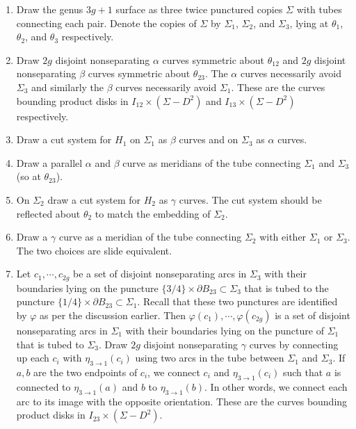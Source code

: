 \documentclass[12pt]{amsart}
\newcommand{\del}{\partial }
\theoremstyle{definition}
\theoremstyle{remark}
\begin{document}
\begin{enumerate}
\item Draw the genus $3g+1$ surface as three twice punctured copies $\Sigma$ with tubes connecting each pair.
Denote the copies of $\Sigma$ by $\Sigma_1$, $\Sigma_2$, and $\Sigma_3$, lying at $\theta_1$, $\theta_2$, and $\theta_3$ respectively.
\item Draw $2g$ disjoint nonseparating $\alpha$ curves symmetric about $\theta_{12}$ and $2g$ disjoint nonseparating $\beta$ curves symmetric about $\theta_{23}$.
The $\alpha$ curves necessarily avoid $\Sigma_3$ and similarly the $\beta$ curves necessarily avoid $\Sigma_1$.
These are the curves bounding product disks in $I_{12} \times (\Sigma - D^2)$ and $I_{13} \times (\Sigma - D^2)$ respectively.
\item Draw a cut system for $H_1$ on $\Sigma_1$ as $\beta$ curves and on $\Sigma_3$ as $\alpha$ curves.
\item Draw a parallel $\alpha$ and $\beta$ curve as meridians of the tube connecting  $\Sigma_1$ and $\Sigma_3$ (so at $\theta_{23}$).

\item On $\Sigma_2$ draw a cut system for $H_2$ as $\gamma$ curves.
The cut system should be reflected about $\theta_2$ to match the embedding of $\Sigma_2$.
\item Draw a $\gamma$ curve as a meridian of the tube connecting $\Sigma_2$ with either $\Sigma_1$ or $\Sigma_3$.
The two choices are slide equivalent.
\item Let $c_1,\cdots,c_{2g}$ be a set of disjoint nonseparating arcs in $\Sigma_3$ with their boundaries lying on the puncture $\{3/4\} \times \del B_{23} \subset \Sigma_3$ that is tubed to the puncture $\{1/4\} \times \del B_{23} \subset \Sigma_1$.
Recall that these two punctures are identified by $\varphi$ as per the discussion earlier.
Then $\varphi(c_1),\cdots,\varphi(c_{2g})$ is a set of disjoint nonseparating arcs in $\Sigma_1$ with their boundaries lying on the puncture of $\Sigma_1$ that is tubed to $\Sigma_3$.
Draw $2g$ disjoint nonseparating $\gamma$ curves by connecting up each $c_i$ with $\eta_{3 \to 1}(c_i)$ using two arcs in the tube between $\Sigma_1$ and $\Sigma_3$.
If $a,b$ are the two endpoints of $c_i$, we connect $c_i$ and $\eta_{3 \to 1}(c_i)$ such that $a$ is connected to $\eta_{3 \to 1}(a)$ and $b$ to $\eta_{3 \to 1}(b)$.
In other words, we connect each arc to its image with the opposite orientation.
These are the curves bounding product disks in $I_{23} \times (\Sigma - D^2)$.
\end{enumerate}
\end{document}
